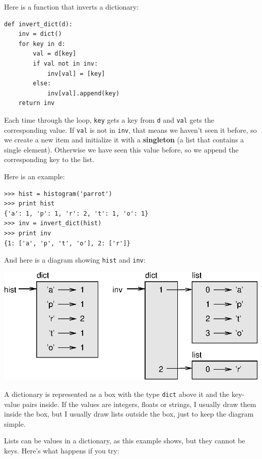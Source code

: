 \documentclass[10pt]{book}
\begin{document}

Here is a function that inverts a dictionary:

\beforeverb
\begin{verbatim}
def invert_dict(d):
    inv = dict()
    for key in d:
        val = d[key]
        if val not in inv:
            inv[val] = [key]
        else:
            inv[val].append(key)
    return inv
\end{verbatim}
\afterverb
%
Each time through the loop, {\tt key} gets a key from {\tt d} and 
{\tt val} gets the corresponding value.  If {\tt val} is not in {\tt inv},
that means we haven't seen it before, so we create a new item and
initialize it with a {\bf singleton} (a list that contains a
single element).  Otherwise we have seen this value before, so we
append the corresponding key to the list.


Here is an example:

\beforeverb
\begin{verbatim}
>>> hist = histogram('parrot')
>>> print hist
{'a': 1, 'p': 1, 'r': 2, 't': 1, 'o': 1}
>>> inv = invert_dict(hist)
>>> print inv
{1: ['a', 'p', 't', 'o'], 2: ['r']}
\end{verbatim}
\afterverb
%
And here is a diagram showing {\tt hist} and {\tt inv}:


\beforefig
\centerline{\includegraphics{figs/dict1.eps}}
\afterfig

A dictionary is represented as a box with the type {\tt dict} above it
and the key-value pairs inside.  If the values are integers, floats or
strings, I usually draw them inside the box, but I usually draw lists
outside the box, just to keep the diagram simple.

Lists can be values in a dictionary, as this example shows, but they
cannot be keys.  Here's what happens if you try:
\end{document}
